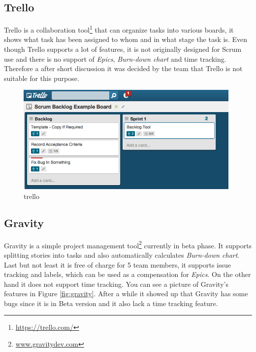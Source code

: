 \newpage
\subsection{Trello}
\label{subsec:TrelloToolDescription}
Trello is a collaboration tool\footnote{\url{https://trello.com/}} that can organize tasks into various boards, it shows what task has been assigned to whom and in what stage the task is.
Even though Trello supports a lot of features, it is not originally designed for Scrum use and there is no support of \emph{Epics}, \emph{Burn-down chart} and time tracking. 
Therefore a after short discussion it was decided by the team that Trello is not suitable for this purpose.
\begin{figure}[H]
    \centering
        \includegraphics[width=11cm]{preliminaryStudies/trello.png}
    \caption{trello}
    \label{fig:trello}
\end{figure}

\subsection{Gravity} 
\label{subsec:GravityToolDescription}
Gravity is a simple project management tool\footnote{\url{www.gravitydev.com}} currently in beta phase.
It supports splitting stories into tasks and also automatically calculates \emph{Burn-down chart}. 
Last but not least it is free of charge for 5 team members, it supports issue tracking and labels, which can be used as a compensation for \emph{Epics}.
On the other hand it does not support time tracking.
You can see a picture of Gravity's features in Figure \ref{fig:gravity}. After a while it showed up that Gravity has some bugs since it is in Beta version and it also lack a time tracking feature.

